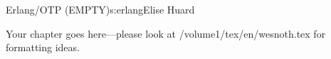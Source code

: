 \begin{aosachapter}{Erlang/OTP (EMPTY)}{s:erlang}{Elise Huard}

Your chapter goes here---please look at /volume1/tex/en/wesnoth.tex for 
formatting ideas.

\end{aosachapter}
